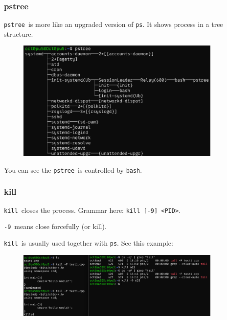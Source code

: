 \documentclass[12pt]{ctexart}
\begin{document}
\subsubsection{\textbf{pstree}}

\texttt{pstree}\ is more like an upgraded version of \texttt{ps}. It
shows process in a tree structure.

\begin{figure}[H]
    \centering
    \includegraphics[width=0.9\textwidth,keepaspectratio]{assets/Linux/1.10 Linux process commands/2.png}
\end{figure}

You can see the \texttt{pstree}\ is controlled by \texttt{bash}.

\subsubsection{\textbf{kill}}

\texttt{kill}\ closes the process. Grammar here:
\texttt{kill\ {[}-9{]}\ \textless{}PID\textgreater{}}.

\texttt{-9}\ means close forcefully (or kill).

\texttt{kill}\ is usually used together with \texttt{ps}. See this
example:

\begin{figure}[H]
    \centering
    \includegraphics[width=0.9\textwidth,keepaspectratio]{assets/Linux/1.10 Linux process commands/3.png}
\end{figure}
\end{document}
